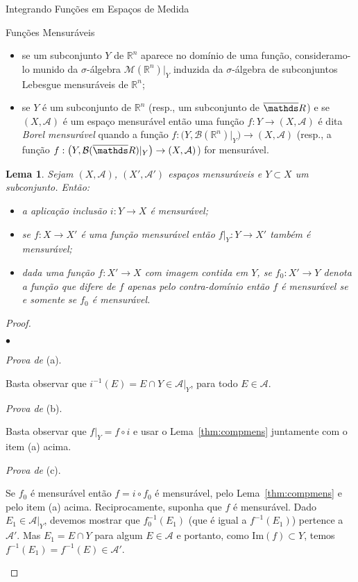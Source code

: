 \documentclass[oneside,final,11pt]{amsbook}
\newcommand{\R}{\mathds R}
\newcommand{\Img}{\mathrm{Im}}
\newcommand{\Borel}{\mathcal B}
\newcommand{\Lebmens}{\mathcal M}
\newcounter{contador}
\newenvironment{bulletindent}{\setcounter{contador}{0}
\begin{list} {$\bullet$}
{\usecounter{contador}
\setlength{\leftmargin}{10pt}
\setlength{\rightmargin}{10pt}
\setlength{\labelsep}{5pt}
\setlength{\itemsep}{10pt}
\setlength{\topsep}{10pt}}}
{\end{list}}
\theoremstyle{remark}\newtheorem{exercise}{Exercício}[chapter]
\theoremstyle{remark}\newtheorem{*exercise}[exercise]{\hbox to 0pt{\hskip 0pt minus 1fil*}Exercício}
\theoremstyle{definition}\newtheorem{exdefin}{Definição}[chapter]
\theoremstyle{plain}\newtheorem{teo}{Teorema}[section]
\theoremstyle{plain}\newtheorem{lem}[teo]{Lema}
\theoremstyle{plain}\newtheorem{prop}[teo]{Proposição}
\theoremstyle{plain}\newtheorem{cor}[teo]{Corolário}
\theoremstyle{definition}\newtheorem{defin}[teo]{Definição}
\theoremstyle{remark}\newtheorem{rem}[teo]{Observação}
\theoremstyle{definition}\newtheorem{notation}[teo]{Notação}
\theoremstyle{definition}\newtheorem{convention}[teo]{Convenção}
\theoremstyle{definition}\newtheorem{example}[teo]{Exemplo}
\numberwithin{section}{chapter}
\numberwithin{equation}{section}
\begin{document}
\begin{chapter}{Integrando Funções em Espaços de Medida}
\begin{section}{Funções Mensuráveis}
\begin{itemize}
\item se um subconjunto $Y$ de $\R^n$ aparece no domínio de uma função, consideramo-lo munido
da $\sigma$-álgebra $\Lebmens(\R^n)\vert_Y$ induzida da $\sigma$-ál\-ge\-bra de subconjuntos
Lebesgue mensuráveis de $\R^n$;

\item se $Y$ é um subconjunto de $\R^n$ (resp., um subconjunto de $\overline\R$) e se
$(X,\mathcal A)$ é um espaço mensurável então uma função $f:Y\to(X,\mathcal A)$ é dita
{\em Borel mensurável\/} quando a função $f:\big(Y,\Borel(\R^n)\vert_Y\big)\to(X,\mathcal A)$
(resp., a função $f:\big(Y,\Borel(\overline\R)\vert_Y\big)\to(X,\mathcal A)$) for mensurável.
\end{itemize}

\begin{lem}\label{thm:propsrestr}
Sejam $(X,\mathcal A)$, $(X',\mathcal A')$ espaços mensuráveis e $Y\subset X$ um subconjunto. Então:
\begin{itemize}
\item[(a)] a aplicação inclusão $i:Y\to X$ é mensurável;
\item[(b)] se $f:X\to X'$ é uma função mensurável então $f\vert_Y:Y\to X'$ também é mensurável;
\item[(c)] dada uma função $f:X'\to X$ com imagem contida em $Y$, se $f_0:X'\to Y$ denota a função que difere de $f$ apenas
pelo contra-domínio então $f$ é mensurável se e somente se $f_0$ é mensurável.
\end{itemize}
\end{lem}
\begin{proof}\
\begin{bulletindent}
\item {\em Prova de\/} (a).

Basta observar que $i^{-1}(E)=E\cap Y\in\mathcal A\vert_Y$, para todo $E\in\mathcal A$.

\item {\em Prova de\/} (b).

Basta observar que $f\vert_Y=f\circ i$ e usar o Lema~\ref{thm:compmens} juntamente com o item (a) acima.

\item {\em Prova de\/} (c).

Se $f_0$ é mensurável então $f=i\circ f_0$ é mensurável, pelo Lema~\ref{thm:compmens} e pelo item (a) acima.
Reciprocamente, suponha que $f$ é mensurável. Dado $E_1\in\mathcal A\vert_Y$, devemos mostrar que $f_0^{-1}(E_1)$
(que é igual a $f^{-1}(E_1)$) pertence a $\mathcal A'$. Mas $E_1=E\cap Y$ para algum $E\in\mathcal A$ e portanto,
como $\Img(f)\subset Y$, temos $f^{-1}(E_1)=f^{-1}(E)\in\mathcal A'$.\qedhere
\end{bulletindent}
\end{proof}


\end{section}
\end{chapter}
\end{document}
